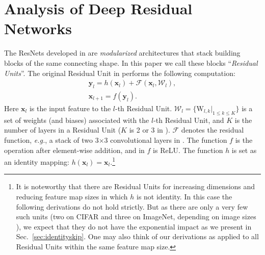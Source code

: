 \documentclass[runningheads]{llncs}
\def\eg{\emph{e.g.}}
\newcommand{\ve}[1]{\mathbf{#1}} %
\newcommand{\ma}[1]{\mathrm{#1}} %
\begin{document}
\section{Analysis of Deep Residual Networks}

The ResNets developed in \cite{He2016} are \emph{modularized} architectures that stack building blocks of the same connecting shape. In this paper we call these blocks ``\emph{Residual Units}''. The original Residual Unit in \cite{He2016} performs the following computation:
\begin{gather}
\ve{y}_{l} = h(\ve{x}_{l}) + \mathcal{F}(\ve{x}_{l}, \mathcal{W}_l), \label{eq:resunit1}\\
\ve{x}_{l+1} = f(\ve{y}_{l}) \label{eq:resunit2}.
\end{gather}
Here $\ve{x}_{l}$ is the input feature to the $l$-th Residual Unit. $\mathcal{W}_l=\{\ma{W}_{l,k} | _{1\leq k \leq K}\}$ is a set of weights (and biases) associated with the $l$-th Residual Unit, and $K$ is the number of layers in a Residual Unit ($K$ is 2 or 3 in \cite{He2016}). $\mathcal{F}$ denotes the residual function, \eg, a stack of two 3$\times$3 convolutional layers in \cite{He2016}. The function $f$ is the operation after element-wise addition, and in \cite{He2016} $f$ is ReLU. The function $h$ is set as an identity mapping: $h(\ve{x}_{l}) = \ve{x}_{l}$.\footnote{It is noteworthy that there are Residual Units for increasing dimensions and reducing feature map sizes \cite{He2016} in which $h$ is not identity.
In this case the following derivations do not hold strictly. But as there are only a very few such units (two on CIFAR and three on ImageNet, depending on image sizes \cite{He2016}), we expect that they do not have the exponential impact as we present in Sec.~\ref{sec:identityskip}. One may also think of our derivations as applied to all Residual Units within the same feature map size.}
\end{document}
